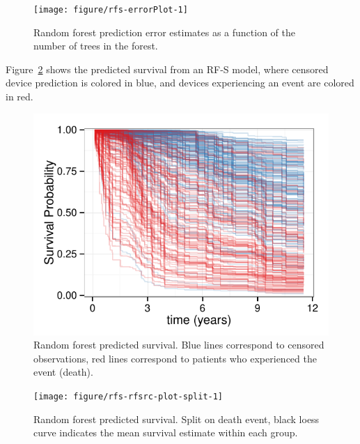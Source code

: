 \documentclass[nojss]{jss}\usepackage[]{graphicx}\usepackage[]{color}
\makeatletter
\def\maxwidth{ %
  \ifdim\Gin@nat@width>\linewidth
    \linewidth
  \else
    \Gin@nat@width
  \fi
}
\makeatother
\begin{document}
\begin{Schunk}
\begin{figure}[!htpb]

{\centering \texttt{[image: figure/rfs-errorPlot-1]} 

}

\caption[Random forest prediction error estimates as a function of the number of trees in the forest]{Random forest prediction error estimates as a function of the number of trees in the forest.\label{fig:errorPlot}}
\end{figure}
\end{Schunk}

Figure~\ref{fig:rfsrc-plot} shows the predicted survival from an RF-S model, where censored device prediction is colored in blue, and devices experiencing an event are colored in red. 
\begin{Schunk}
\begin{figure}[!htpb]

{\centering \includegraphics[width=\maxwidth]{figure/rfs-rfsrc-plot-1} 

}

\caption[Random forest predicted survival]{Random forest predicted survival. Blue lines correspond to censored observations, red lines correspond to patients who experienced the event (death).\label{fig:rfsrc-plot}}
\end{figure}
\end{Schunk}

\begin{Schunk}
\begin{figure}[!htpb]

{\centering \texttt{[image: figure/rfs-rfsrc-plot-split-1]} 

}

\caption[Random forest predicted survival]{Random forest predicted survival. Split on death event, black loess curve indicates the mean survival estimate within each group.\label{fig:rfsrc-plot-split}}
\end{figure}
\end{Schunk}
\end{document}
